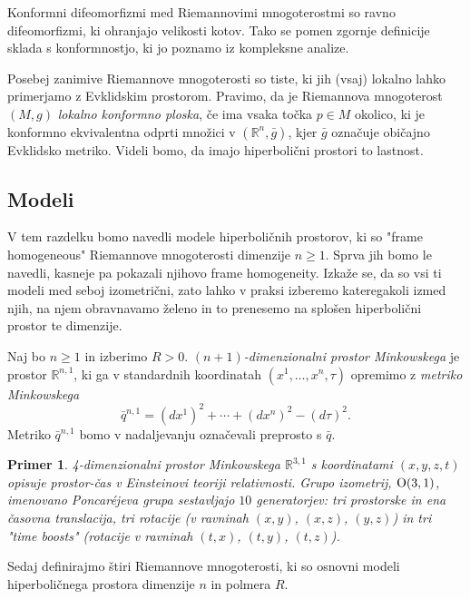 \documentclass[a4paper]{article}
\newtheorem{primer}{Primer}
\begin{document}
Konformni difeomorfizmi med Riemannovimi mnogoterostmi so ravno difeomorfizmi, ki ohranjajo velikosti kotov. Tako se pomen zgornje definicije sklada s konformnostjo, ki jo poznamo iz kompleksne analize.

Posebej zanimive Riemannove mnogoterosti so tiste, ki jih (vsaj) lokalno lahko primerjamo z Evklidskim prostorom. Pravimo, da je Riemannova mnogoterost $(M,g)$ \emph{lokalno konformno ploska}, če ima vsaka točka $p\in M$ okolico, ki je konformno ekvivalentna odprti množici v $(\mathbb{R}^{n}, \bar{g})$, kjer $\bar{g}$ označuje običajno Evklidsko metriko. Videli bomo, da imajo hiperbolični prostori to lastnost.

\subsection{Modeli}

V tem razdelku bomo navedli modele hiperboličnih prostorov, ki so "frame homogeneous" Riemannove mnogoterosti dimenzije $n \geq 1$. Sprva jih bomo le navedli, kasneje pa pokazali njihovo frame homogeneity. Izkaže se, da so vsi ti modeli med seboj izometrični, zato lahko v praksi izberemo kateregakoli izmed njih, na njem obravnavamo želeno in to prenesemo na splošen hiperbolični prostor te dimenzije.

Naj bo $n \geq 1$ in izberimo $R>0$.
\emph{$(n+1)$-dimenzionalni prostor Minkowskega} je prostor $\mathbb{R}^{n,1}$, ki ga v standardnih koordinatah $(x^{1}, \dots , x^{n}, \tau)$ opremimo z \emph{metriko Minkowskega}
\begin{equation}\label{eq:Mink metrika}
\bar{q}^{n,1} = (dx^{1})^2 + \cdots + (dx^{n})^2 - (d\tau)^2.
\end{equation}
Metriko $\bar{q}^{n,1}$ bomo v nadaljevanju označevali preprosto s $\bar{q}$.

\begin{primer}
4-dimenzionalni prostor Minkowskega $\mathbb{R}^{3,1}$ s koordinatami $(x,y,z,t)$ opisuje prostor-čas v Einsteinovi teoriji relativnosti. Grupo izometrij, $\textup{O}(3,1)$, imenovano \emph{Poncar\'ejeva grupa} sestavljajo $10$ generatorjev: tri prostorske in ena časovna translacija, tri rotacije (v ravninah $(x,y)$, $(x,z)$, $(y,z)$) in tri "time boosts" (rotacije v ravninah $(t,x)$, $(t,y)$, $(t,z)$).
\end{primer}

Sedaj definirajmo štiri Riemannove mnogoterosti, ki so osnovni modeli hiperboličnega prostora dimenzije $n$ in polmera $R$.
\end{document}
